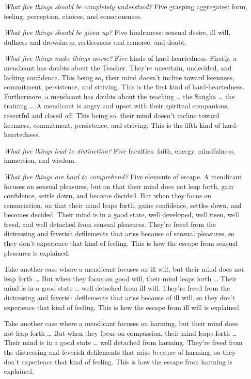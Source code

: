 \documentclass[12pt,openany]{book}%
\begin{document}
\emph{What five things should be completely understood?} Five grasping aggregates: form, feeling, perception, choices, and consciousness. 

\emph{What five things should be given up?} Five hindrances: sensual desire, ill will, dullness and drowsiness, restlessness and remorse, and doubt. 

\emph{What five things make things worse?} Five kinds of hard-heartedness. Firstly, a mendicant has doubts about the Teacher. They’re uncertain, undecided, and lacking confidence. This being so, their mind doesn’t incline toward keenness, commitment, persistence, and striving. This is the first kind of hard-heartedness. Furthermore, a mendicant has doubts about the teaching … the \textsanskrit{Saṅgha} … the training … A mendicant is angry and upset with their spiritual companions, resentful and closed off. This being so, their mind doesn’t incline toward keenness, commitment, persistence, and striving. This is the fifth kind of hard-heartedness. 

\emph{What five things lead to distinction?} Five faculties: faith, energy, mindfulness, immersion, and wisdom. 

\emph{What five things are hard to comprehend?} Five elements of escape. A mendicant focuses on sensual pleasures, but on that their mind does not leap forth, gain confidence, settle down, and become decided. But when they focus on renunciation, on that their mind leaps forth, gains confidence, settles down, and becomes decided. Their mind is in a good state, well developed, well risen, well freed, and well detached from sensual pleasures. They’re freed from the distressing and feverish defilements that arise because of sensual pleasures, so they don’t experience that kind of feeling. This is how the escape from sensual pleasures is explained. 

Take another case where a mendicant focuses on ill will, but their mind does not leap forth … But when they focus on good will, their mind leaps forth … Their mind is in a good state … well detached from ill will. They’re freed from the distressing and feverish defilements that arise because of ill will, so they don’t experience that kind of feeling. This is how the escape from ill will is explained. 

Take another case where a mendicant focuses on harming, but their mind does not leap forth … But when they focus on compassion, their mind leaps forth … Their mind is in a good state … well detached from harming. They’re freed from the distressing and feverish defilements that arise because of harming, so they don’t experience that kind of feeling. This is how the escape from harming is explained. 
\end{document}
